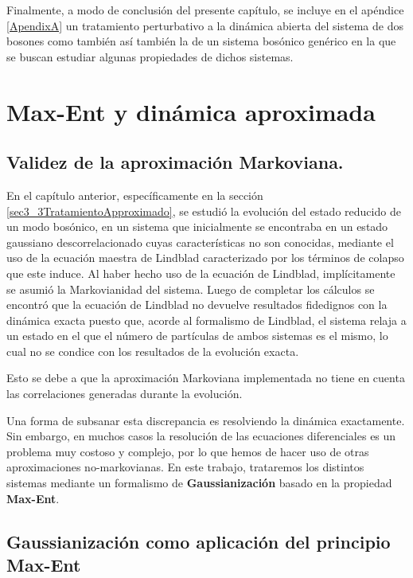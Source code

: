\documentclass{report} %
\numberwithin{equation}{section}
\begin{document}
Finalmente, a modo de conclusión del presente capítulo, se incluye en el apéndice \ref{ApendixA} un tratamiento perturbativo a la dinámica abierta del sistema de dos bosones como también así también la de un sistema bosónico genérico en la que se buscan estudiar algunas propiedades de dichos sistemas. 

\clearpage

\chapter{Max-Ent y din\'amica aproximada}
\label{chap4_allmaxent}

\section*{Validez de la aproximaci\'on Markoviana.}

En el capítulo anterior, específicamente en la sección \ref{sec3_3TratamientoApproximado}, se estudió la evolución
del estado reducido de un modo bosónico, en un sistema que inicialmente se encontraba en un estado gaussiano descorrelacionado 
cuyas caracter\'isticas no son conocidas, mediante el uso de la ecuaci\'on maestra de Lindblad 
caracterizado por los t\'erminos de colapso que este induce. 
Al haber hecho uso de la ecuación de Lindblad, implícitamente se asumió la Markovianidad del sistema. Luego de completar los cálculos se encontró que la ecuación de Lindblad no devuelve resultados fidedignos con la dinámica exacta puesto que, acorde al formalismo de Lindblad, el sistema relaja a un estado en el que el número de partículas de ambos sistemas es el mismo, lo cual no se condice con los resultados de la evolución exacta. 

Esto se debe a que la aproximación Markoviana implementada no tiene en cuenta las correlaciones generadas durante la evolución. 

Una forma de subsanar esta discrepancia es resolviendo la dinámica exactamente. Sin embargo, en muchos casos la resolución de las ecuaciones diferenciales es un problema muy costoso y complejo, por lo que hemos de hacer uso de otras aproximaciones no-markovianas. 
En este trabajo, trataremos los distintos sistemas mediante un formalismo de \textbf{Gaussianización} basado en la propiedad \textbf{Max-Ent}.

\section*{Gaussianizaci\'on como aplicaci\'on del principio Max-Ent}
\end{document}
